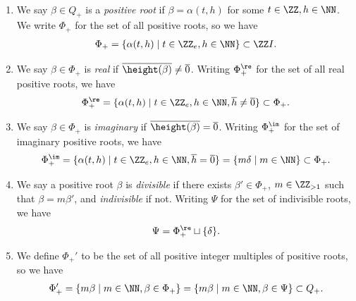 \begin{defi} \(\)
\begin{enumerate}
\item
We say \(\beta \in Q_+\) is a {\em positive root} if \(\beta = \alpha(t,h)\) for some \(t \in \ZZ, h \in \NN\). We write \(\Phi_+\) for the set of all positive roots, so we have
\begin{align}
\Phi_+ = \{ \alpha(t,h) \mid t \in \ZZ_e, h \in \NN\} \subset \ZZ I.
\end{align}
\item We say \(\beta \in \Phi_+\) is {\em real} if \(\overline{\height(\beta)} \neq \overline 0\). Writing \(\Phi_+^\re\) for the set of all real positive roots, we have
\begin{align}
\Phi_+^\re =  \{ \alpha(t,h) \mid t \in \ZZ_e, h \in \NN, \overline h \neq \overline 0\} \subset \Phi_+.
\end{align}
\item We say \(\beta \in \Phi_+\) is {\em imaginary} if \(\overline{\height(\beta)} = \overline 0\).  Writing \(\Phi_+^\im\) for the set of imaginary positive roots, we have
\begin{align}\label{allimag}
\Phi_+^\im =  \{ \alpha(t,h) \mid t \in \ZZ_e, h \in \NN, \overline h = \overline 0\} = \{m \delta \mid m \in\NN \} \subset \Phi_+.
\end{align}
\item We say a positive root \(\beta\) is {\em divisible} if there exists \(\beta' \in \Phi_+\), \(m \in \ZZ_{>1}\) such that \(\beta= m \beta'\), and {\em indivisible} if not. Writing \(\Psi\) for the set of indivisible roots, we have
\begin{align}\label{PsiDef}
\Psi = \Phi_+^\re \sqcup \{ \delta\} .
\end{align}
\item We define \(\Phi_+'\) to be the set of all positive integer multiples of positive roots, so we have
\begin{align}\label{multphi}
\Phi_+' = \{m \beta \mid m \in \NN, \beta \in \Phi_+\} = \{m \beta \mid m \in \NN, \beta \in \Psi\} \subset Q_+.
\end{align}
\end{enumerate}
\end{defi}

